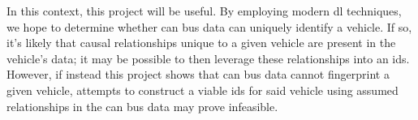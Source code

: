 \documentclass[11pt]{article}
\begin{document}
In this context, this project will be useful. By employing modern \ac{dl} techniques, we hope to determine whether \ac{can} bus data can uniquely identify a vehicle. If so, it's likely that causal relationships unique to a given vehicle are present in the vehicle's data; it may be possible to then leverage these relationships into an \ac{ids}. However, if instead this project shows that \ac{can} bus data cannot fingerprint a given vehicle, attempts to construct a viable \ac{ids} for said vehicle using assumed relationships in the \ac{can} bus data may prove infeasible.



\end{document}
